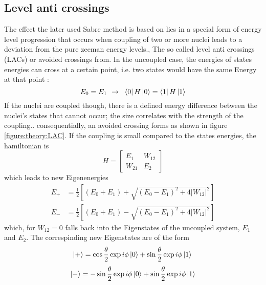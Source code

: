         \subsection{Level anti crossings}
        The effect the later used Sabre method is based on lies in a special form of energy level progression that occurs when coupling of two or more nuclei leads to a deviation from the pure zeeman energy levels., The so called level anti crossings (LACs) or avoided crossings from. In the uncoupled case, the energies of states energies can cross at a certain point, i.e. two states would have the same Energy at that point \cite{ivanov_role_2014-2,pravdivtsev_spin_2014}:
        \begin{equation}
            E_0 = E_1 \mathrm{~~\rightarrow~~} \bra{0}H\ket{0} = \bra{1}H\ket{1}
        \end{equation}
        If the nuclei are coupled though, there is a defined energy difference between the nuclei's states that cannot occur; the size correlates with the strength of the coupling.. consequentially, an avoided crossing forms as shown in figure \ref{figure:theory:LAC}. If the coupling is small compared to the states energies, the hamiltonian is 
        \begin{equation}
            H = \left [
                \begin{array}{ll}
                    E_{1} & W_{12}\\
                    W_{21} & E_2
                \end{array}
            \right ]
        \end{equation} 
        which leads to new Eigenenergies
        \begin{align*}
            E_+ &= \frac{1}{2} \left[(E_0+ E_1) + \sqrt{(E_0-E_1)^2+4|W_{12}|^2}\right]\\
            E_- &= \frac{1}{2} \left[(E_0+ E_1) - \sqrt{(E_0-E_1)^2+4|W_{12}|^2}\right]
        \end{align*}
        which, for $W_{12}=0$ falls back into the Eigenstates of the uncoupled system, $E_1$ and $E_2$. The correspinding new Eigenstates are of the form
        \begin{equation*}
            \ket{+} = \cos\frac{{\theta}}{2}\exp{i\phi}\ket{0} + \sin{\frac{\theta}{2}}\exp{i\phi}\ket{1}\\
        \end{equation*}
        \begin{equation*}
            \ket{-} = -\sin{\frac{\theta}{2}}\exp{i\phi}\ket{0} + \sin{\frac{\theta}{2}}\exp{i\phi}\ket{1}
        \end{equation*}
